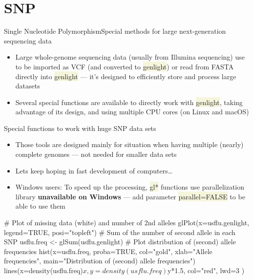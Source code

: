 \documentclass[compress, xelatex, 11pt, xcolor=svgnames, aspectratio=169,
	hyperref={
		bookmarks=true,
		unicode=true,
		colorlinks=true,
		pdftitle={Molecular data in R},
		plainpages=false,
		pdfauthor={Vojtech Zeisek},
		pdfsubject={Course about phylogeny and evolution in R},
		pdfcreator={XeLaTeX},
		pdfkeywords={R, evolution, phylogeny, molecular data},
		linkcolor=Crimson, %
		anchorcolor=Magenta, %
		citecolor=Magenta, %
		filecolor=Magenta, %
		menucolor=Magenta, %
		urlcolor=DodgerBlue, %
		},
	url={hyphens, lowtilde} %
	]{beamer}
\renewcommand{\texttt}[1]{\colorbox{Beige}{{\ttfamily #1}}}
\begin{document}
\section{SNP}

\begin{frame}{Single Nucleotide Polymorphism}{Special methods for large next-generation sequencing data}
	\tableofcontents[currentsection, sectionstyle=show/hide, hideothersubsections]
	\begin{itemize}
		\item Large whole-genome sequencing data (usually from Illumina sequencing) use to be imported as VCF (and converted to \texttt{genlight}) or read from FASTA directly into \texttt{genlight} --- it's designed to efficiently store and process large datasets
		\item Several special functions are available to directly work with \texttt{genlight}, taking advantage of its design, and using multiple CPU cores (on Linux and macOS)
	\end{itemize}
\end{frame}

\begin{frame}[fragile]{Special functions to work with huge SNP data sets}
	\begin{itemize}
		\item Those tools are designed mainly for situation when having multiple (nearly) complete genomes --- not needed for smaller data sets
		\item Lets keep hoping in fast development of computers\ldots
		\item \alert{Windows users:} To speed up the processing, \texttt{gl*} functions use parallelization library \textbf{unavailable on Windows} --- add parameter \texttt{parallel=FALSE} to be able to use them
	\end{itemize}
	\begin{spluscode}
    # Plot of missing data (white) and number of 2nd alleles
    glPlot(x=usflu.genlight, legend=TRUE, posi="topleft")
    # Sum of the number of second allele in each SNP
    usflu.freq <- glSum(usflu.genlight)
    # Plot distribution of (second) allele frequencies
    hist(x=usflu.freq, proba=TRUE, col="gold", xlab="Allele frequencies",
      main="Distribution of (second) allele frequencies")
    lines(x=density(usflu.freq)$x, y=density(usflu.freq)$y*1.5, col="red",
      lwd=3 )
	\end{spluscode}
\end{frame}
\end{document}
